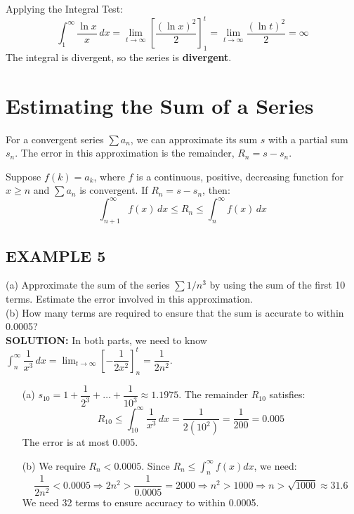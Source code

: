\documentclass{article}
\theoremstyle{mystyle}
\begin{document}
Applying the Integral Test:
\[ \int_1^\infty \dfrac{\ln x}{x} \,dx = \lim_{t\to\infty} \left[ \dfrac{(\ln x)^2}{2} \right]_1^t = \lim_{t\to\infty} \dfrac{(\ln t)^2}{2} = \infty \]
The integral is divergent, so the series is \textbf{divergent}.

\section*{Estimating the Sum of a Series}
For a convergent series \( \sum a_n \), we can approximate its sum \(s\) with a partial sum \(s_n\). The error in this approximation is the remainder, \(R_n = s - s_n\).

\begin{tcolorbox}[
    colback=white,
    colframe=orange!80!white,
    title=Remainder Estimate for the Integral Test,
    boxrule=0.5mm,
    arc=3mm
    ]
    Suppose \(f(k) = a_k\), where \(f\) is a continuous, positive, decreasing function for \(x \ge n\) and \( \sum a_n \) is convergent. If \(R_n = s - s_n\), then:
    \[ \int_{n+1}^\infty f(x) \,dx \le R_n \le \int_n^\infty f(x) \,dx \]
\end{tcolorbox}

\subsection*{EXAMPLE 5}
(a) Approximate the sum of the series \( \sum 1/n^3 \) by using the sum of the first 10 terms. Estimate the error involved in this approximation. \\
(b) How many terms are required to ensure that the sum is accurate to within 0.0005?\\
\textbf{SOLUTION:}
In both parts, we need to know \( \int_n^\infty \dfrac{1}{x^3} \,dx = \lim_{t\to\infty} \left[ -\dfrac{1}{2x^2} \right]_n^t = \dfrac{1}{2n^2} \).
\begin{itemize}
    \item[(a)] \( s_{10} = 1 + \dfrac{1}{2^3} + \dots + \dfrac{1}{10^3} \approx 1.1975 \). The remainder \(R_{10}\) satisfies:
    \[ R_{10} \le \int_{10}^\infty \dfrac{1}{x^3} \,dx = \dfrac{1}{2(10^2)} = \dfrac{1}{200} = 0.005 \]
    The error is at most 0.005.
    \item[(b)] We require \(R_n < 0.0005\). Since \(R_n \le \int_n^\infty f(x) dx\), we need:
    \[ \dfrac{1}{2n^2} < 0.0005 \Rightarrow 2n^2 > \dfrac{1}{0.0005} = 2000 \Rightarrow n^2 > 1000 \Rightarrow n > \sqrt{1000} \approx 31.6 \]
    We need 32 terms to ensure accuracy to within 0.0005.
\end{itemize}
\end{document}
